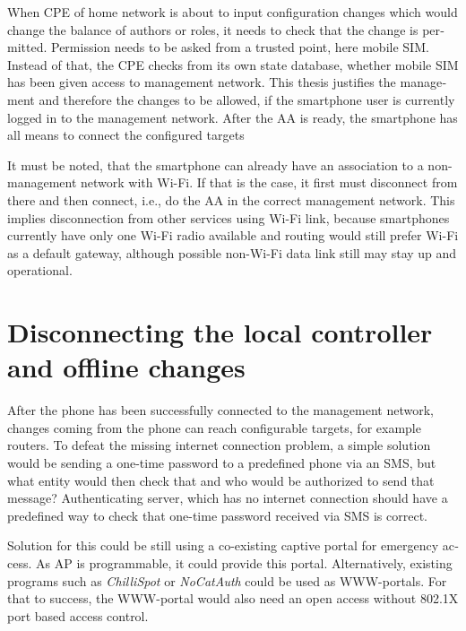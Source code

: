 \documentclass[12pt,a4paper,english]{tutthesis}
\begin{document}
\begin{otherlanguage}{english}
When CPE of home network is about to input configuration changes which
would change the balance of authors or roles, it needs to check that
the change is permitted.  Permission needs to be asked from a trusted
point, here mobile SIM. Instead of that, the CPE checks from its own
state database, whether mobile SIM has been given access to management
network.
This thesis justifies the management and therefore the changes to be
allowed, if the smartphone user is currently logged in to the
management network.
After the AA is ready, the smartphone has all means to connect the
configured targets

It must be noted, that the smartphone can already have an association
to a non-management network with Wi-Fi. If that is the case, it first
must disconnect from there and then connect, i.e., do the  AA in the correct management
network. This implies disconnection from other services using Wi-Fi
link, because smartphones currently have only one Wi-Fi radio
available and routing would still prefer Wi-Fi as a default gateway, although
possible non-Wi-Fi data link still may stay up and operational.
\section{Disconnecting the local controller and offline changes}
\label{sec-4-6}
\label{sec:disconnections}













After the phone has been successfully connected to the management
network, changes coming from the phone can reach configurable targets,
for example routers.  
To defeat the missing internet connection problem, a simple solution would be
sending a one-time password to a predefined phone via an SMS, but what
entity would then check that and who would be authorized to send that message?
Authenticating server, which has no internet connection should 
have a predefined way to check that one-time password received via SMS is correct.

Solution for this could be still using a co-existing captive portal
for emergency access. As AP is programmable, it could
provide this portal.  Alternatively, existing programs such as
\emph{ChilliSpot} or \emph{NoCatAuth} could be used as WWW-portals.  For that to
success, the WWW-portal would also need an open access without 802.1X
port based access control.


\end{otherlanguage}
\end{document}

